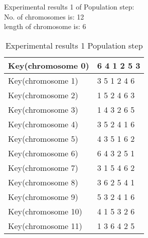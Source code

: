 \textsf{Experimental results 1 of Population step:}\\
    \colorbox{blue!30}{\textsf{     No. of chromosomes is: 12}}\\
    \colorbox{blue!30}{\textsf{     length of chromosome is: 6}}

\begin{table}[h!]
\centering
\begin{tabular}{l l}\hline
    Key(chromosome 0)&6 4 1 2 5 3\\ \hline 
    Key(chromosome 1)&3 5 1 2 4 6 \\ \hline 
    Key(chromosome 2)&1 5 2 4 6 3 \\ \hline 
    Key(chromosome 3)&1 4 3 2 6 5 \\ \hline 
    Key(chromosome 4)&3 5 2 4 1 6 \\ \hline 
    Key(chromosome 5)&4 3 5 1 6 2 \\ \hline 
    Key(chromosome 6)&6 4 3 2 5 1 \\ \hline 
    Key(chromosome 7)&3 1 5 4 6 2 \\ \hline 
    Key(chromosome 8)&3 6 2 5 4 1 \\ \hline 
    Key(chromosome 9)&5 3 2 4 1 6 \\ \hline 
    Key(chromosome 10)&4 1 5 3 2 6 \\ \hline 
    Key(chromosome 11)&1 3 6 4 2 5 \\ \hline  
\end{tabular}
\caption{Experimental results 1 Population step}

\end{table}


